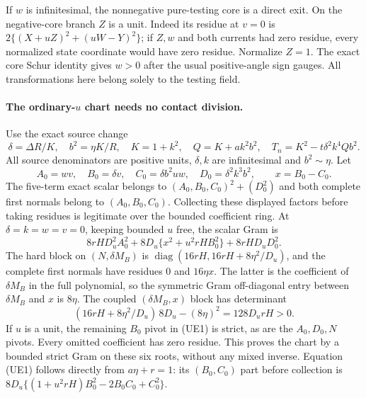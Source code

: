 If $w$ is infinitesimal, the nonnegative pure-testing core is a direct
exit. On the negative-core branch $Z$ is a unit. Indeed its residue
at $v=0$ is $2\{(X+uZ)^2+(uW-Y)^2\}$; if $Z,w$ and both currents
had zero residue, every normalized state coordinate would have zero
residue. Normalize $Z=1$. The exact core Schur identity gives $w>0$
after the usual positive-angle sign gauges. All transformations here
belong solely to the testing field.

\paragraph{The ordinary-$u$ chart needs no contact division.}
Use the exact source change
\[
 \delta=\Delta R/K,\quad b^2=\eta K/R,\quad K=1+k^2,
 \quad Q=K+ak^2b^2,\quad T_n=K^2-t\delta^2k^4Qb^2.
\]
All source denominators are positive units, $\delta,k$ are
infinitesimal and $b^2\sim\eta$. Let
\[
 A_0=wv,\quad B_0=\delta v,\quad C_0=\delta b^2uw,
 \quad D_0=\delta^2k^3b^2,\qquad x=B_0-C_0.
\]
The five-term exact scalar belongs to
$(A_0,B_0,C_0)^2+(D_0^2)$ and both complete first normals belong
to $(A_0,B_0,C_0)$. Collecting these displayed factors before taking
residues is legitimate over the bounded coefficient ring. At
$\delta=k=w=v=0$, keeping bounded $u$ free, the scalar Gram is
\[
 8rH D_u^2A_0^2+
 8D_u\{x^2+u^2rH B_0^2\}+8rH D_uD_0^2.
 \tag{UE1}
\]
The hard block on $(N,\delta M_B)$ is
$\operatorname{diag}(16rH,16rH+8\eta^2/D_u)$, and the complete
first normals have residues $0$ and $16\eta x$. The latter is the
coefficient of $\delta M_B$ in the full polynomial, so the symmetric
Gram off-diagonal entry between $\delta M_B$ and $x$ is $8\eta$.
The coupled $(\delta M_B,x)$ block has determinant
\[
 (16rH+8\eta^2/D_u)\,8D_u-(8\eta)^2=128D_urH>0.
 \tag{UE2}
\]
If $u$ is a unit, the remaining $B_0$ pivot in (UE1) is strict,
as are the $A_0,D_0,N$ pivots. Every omitted coefficient has zero
residue. This proves the chart by a bounded strict Gram on these
six roots, without any mixed inverse. Equation (UE1) follows directly
from $a\eta+r=1$: its $(B_0,C_0)$ part before collection is
$8D_u\{(1+u^2rH)B_0^2-2B_0C_0+C_0^2\}$.

